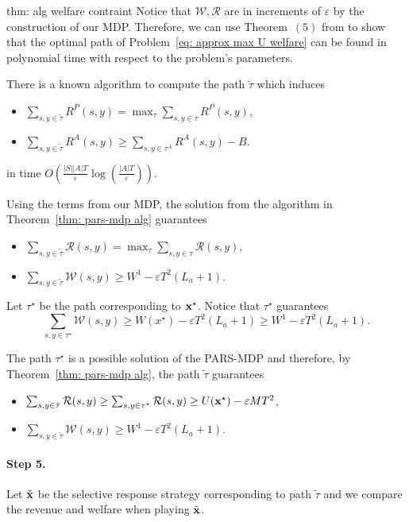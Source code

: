 \begin{proofof}{thm: alg welfare contraint}
Notice that $\mathcal{W}, \mathcal{R}$ are in increments of $\varepsilon$ by the construction of our MDP. Therefore, we can use Theorem~$(5)$ from \cite{ben2024principal} to show that the optimal path of Problem~\eqref{eq: approx max U welfare} can be found in polynomial time with respect to the problem's parameters.

\begin{theorem} \label{thm: pars-mdp alg}
There is a known algorithm to compute the path $\tilde{\tau}$ which induces
\begin{itemize}
    \item $\sum_{s, y \in \tilde{\tau}} R^P(s, y) = \max_{\tau} \sum_{s, y \in \tau} R^P(s, y)$,
    \item $\sum_{s, y \in \tilde{\tau}} R^A(s, y) \geq \sum_{s, y \in \tau^A} R^A(s, y) - B$.
\end{itemize}
in time $O(\frac{|S||A|T}{\varepsilon} \log(\frac{|A|T}{\varepsilon}))$.
\end{theorem}


Using the terms from our MDP, the solution from the algorithm in Theorem~\ref{thm: pars-mdp alg} guarantees

\begin{itemize}
\item $\sum_{s, y \in \tilde{\tau}} \mathcal{R}(s, y) = \max_{\tau} \sum_{s, y \in \tau} \mathcal{R}(s, y)$,
\item $\sum_{s, y \in \tilde{\tau}} \mathcal{W}(s, y) \geq W^1 -  \varepsilon T^2 (L_a+1)$.
\end{itemize}

Let $\tau^\star$ be the path corresponding to ${\bf{x}}^\star$. Notice that $\tau^\star$ guarantees
\[
\sum_{s, y \in \tau^\star} \mathcal{W}(s, y) \geq W(x^\star) - \varepsilon T^2 (L_a+1) \geq W^1 - \varepsilon T^2 (L_a+1).
\]

The path $\tau^\star$ is a possible solution of the PARS-MDP and therefore, by Theorem~\ref{thm: pars-mdp alg}, the path $\tilde{\tau}$ guarantees

\begin{itemize}
\item $\sum_{s, y \in \tilde{\tau}} \mathcal{R}(s, y) \geq \sum_{s, y \in \tau^\star} \mathcal{R}(s, y) \geq U({\bf{x}}^\star) - \varepsilon M T^2$,
\item $\sum_{s, y \in \tilde{\tau}} \mathcal{W}(s, y) \geq W^1 - \varepsilon T^2 (L_a+1)$.
\end{itemize}


\paragraph{Step 5.} 
Let $\tilde{{\bf{x}}}$ be the selective response strategy corresponding to path $\tilde{\tau}$ and we compare the revenue and welfare when playing $\tilde{{\bf{x}}}$.


\end{proofof}
